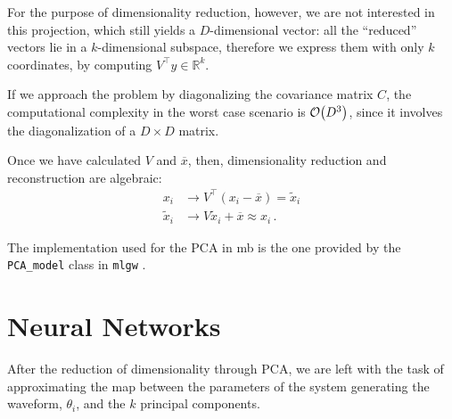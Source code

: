\documentclass[main.tex]{subfiles}
\begin{document}
For the purpose of dimensionality reduction, however, we are not interested in this projection, which still yields a \(D\)-dimensional vector: all the ``reduced'' vectors lie in a \(k\)-dimensional subspace, therefore we express them with only \(k\) coordinates, by computing \(V^{\top} y \in \mathbb{R}^{k}\). 


If we approach the problem by diagonalizing the covariance matrix \(C\), the computational complexity in the worst case scenario is \(\order{D^3}\), since it involves the diagonalization of a \(D \times D\) matrix.

Once we have calculated \(V\) and \(\overline{x}\), then, dimensionality reduction and reconstruction are algebraic: 
%
\begin{align}
x_i &\to V^{\top}(x_i - \overline{x}) = \widetilde{x}_i  \\
\widetilde{x}_i &\to V \widetilde{x}_i + \overline{x} \approx x_i
\,.
\end{align}

The implementation used for the \ac{PCA} in \ac{mb} is the one provided by the \texttt{PCA\_model} class in \texttt{mlgw} \cite[]{schmidtMachineLearningGravitational2020}. 





\section{Neural Networks} \label{sec:neural-network}

After the reduction of dimensionality through \ac{PCA}, we are left with the task of approximating the map between the parameters of the system generating the waveform, \(\theta _i\), and the \(k\) principal components. 
\end{document}
